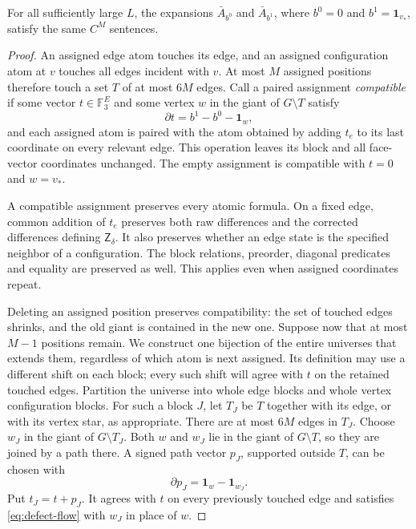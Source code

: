 \begin{proposition}
\label{prop:base-equivalence}
For all sufficiently large \(L\), the expansions
\(\bar A_{b^0}\) and \(\bar A_{b^1}\), where
\(b^0=0\) and \(b^1=\mathbf1_{v_*}\), satisfy the same \(C^M\) sentences.
\end{proposition}
\begin{proof}
An assigned edge atom touches its edge, and an assigned configuration atom
at \(v\) touches all edges incident with \(v\).  At most \(M\) assigned
positions therefore touch a set \(T\) of at most \(6M\) edges.
Call a paired assignment \emph{compatible} if some vector
\(t\in\mathbb F_3^E\) and some vertex \(w\) in the giant of \(G\setminus T\)
satisfy
\begin{equation}
\label{eq:defect-flow}
 \partial t=b^1-b^0-\mathbf1_w,
\end{equation}
and each assigned atom is paired with the atom obtained by adding \(t_e\)
to its last coordinate on every relevant edge.  This operation leaves its
block and all face-vector coordinates unchanged.  The empty assignment is
compatible with \(t=0\) and \(w=v_*\).

A compatible assignment preserves every atomic formula.  On a fixed edge,
common addition of \(t_e\) preserves both raw differences and the corrected
differences defining \(\mathsf Z_\delta\).  It also preserves whether an
edge state is the specified neighbor of a configuration.  The block
relations, preorder, diagonal predicates and equality are preserved as
well.  This applies even when assigned coordinates repeat.

Deleting an assigned position preserves compatibility: the set of touched
edges shrinks, and the old giant is contained in the new one.  Suppose now
that at most \(M-1\) positions remain.  We construct one bijection of the
entire universes that extends them, regardless of which atom is next
assigned. Its definition may use a different shift on each block; every
such shift will agree with \(t\) on the retained touched edges.
Partition the universe into whole edge blocks and whole vertex
configuration blocks.  For such a block \(J\), let \(T_J\) be \(T\) together
with its edge, or with its vertex star, as appropriate.  There are at most
\(6M\) edges in \(T_J\).  Choose \(w_J\) in the giant of \(G\setminus T_J\).
Both \(w\) and \(w_J\) lie in the giant of \(G\setminus T\), so they are
joined by a path there.  A signed path vector \(p_J\), supported outside
\(T\), can be chosen with
\[
 \partial p_J=\mathbf1_w-\mathbf1_{w_J}.
\]
Put \(t_J=t+p_J\).  It agrees with \(t\) on every previously touched edge
and satisfies \eqref{eq:defect-flow} with \(w_J\) in place of \(w\).


\end{proof}
